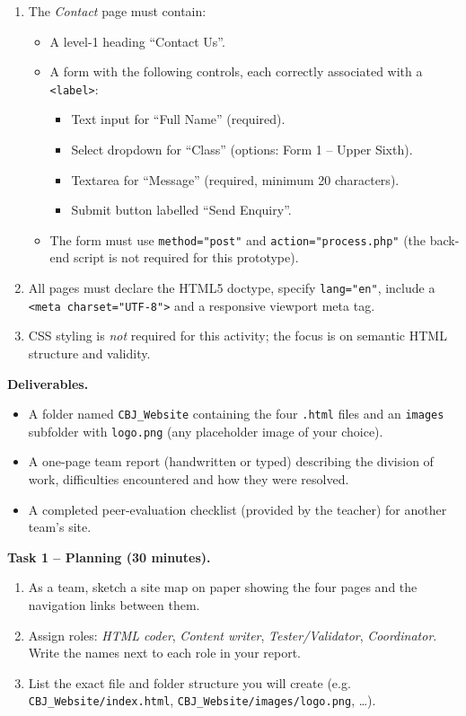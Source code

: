\documentclass[11pt]{article}
\newcommand{\cle}[1]{{\popxbold\color{popdark}#1}}
\newcounter{popsec}
\newcounter{popsub}
\newcommand{\courssub}[1]{%
  \stepcounter{popsub}%
  \par\vspace{9pt}\noindent{\popxbold\fontsize{11.5}{13}\selectfont\color{popink}{\color{poporange}\thepopsec.\thepopsub}\hspace{6pt}#1}\par\nopagebreak\vspace{4pt}
}
\begin{document}
\begin{enumerate}
\begin{itemize}
        \end{itemize}
  \item The \emph{Contact} page must contain:
        \begin{itemize}
          \item A level-1 heading ``Contact Us''.
          \item A form with the following controls, each correctly associated with a \texttt{<label>}:
                \begin{itemize}
                  \item Text input for ``Full Name'' (required).
                  \item Select dropdown for ``Class'' (options: Form 1 -- Upper Sixth).
                  \item Textarea for ``Message'' (required, minimum 20 characters).
                  \item Submit button labelled ``Send Enquiry''.
                \end{itemize}
          \item The form must use \texttt{method="post"} and \texttt{action="process.php"} (the back-end script is not required for this prototype).
        \end{itemize}
  \item All pages must declare the HTML5 doctype, specify \texttt{lang="en"}, include a \texttt{<meta charset="UTF-8">} and a responsive viewport meta tag.
  \item CSS styling is \emph{not} required for this activity; the focus is on \cle{semantic HTML} structure and validity.
\end{enumerate}

\textbf{Deliverables.}
\begin{itemize}
  \item A folder named \texttt{CBJ\_Website} containing the four \texttt{.html} files and an \texttt{images} subfolder with \texttt{logo.png} (any placeholder image of your choice).
  \item A one-page team report (handwritten or typed) describing the division of work, difficulties encountered and how they were resolved.
  \item A completed peer-evaluation checklist (provided by the teacher) for another team's site.
\end{itemize}

\courssub{Tasks}
\textbf{Task 1 -- Planning (30 minutes).}
\begin{enumerate}
  \item As a team, sketch a site map on paper showing the four pages and the navigation links between them.
  \item Assign roles: \emph{HTML coder}, \emph{Content writer}, \emph{Tester/Validator}, \emph{Coordinator}. Write the names next to each role in your report.
  \item List the exact file and folder structure you will create (e.g. \texttt{CBJ\_Website/index.html}, \texttt{CBJ\_Website/images/logo.png}, \dots).
\end{enumerate}
\end{document}
